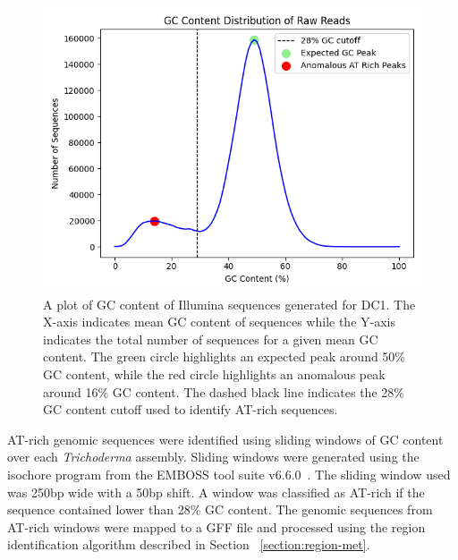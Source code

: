 \begin{figure}
  \centering
  \includegraphics[width=\textwidth]{figures/raw-dc1-gc-plot.png}
  \caption[GC content distribution for DC1]{A plot of GC content of Illumina sequences generated for
    DC1. The X-axis indicates mean GC content of sequences while the
    Y-axis indicates the total number of sequences for a given mean GC
    content. The green circle highlights an expected peak around 50\% GC content, while the red circle highlights an anomalous peak around 16\% GC content. The dashed black line indicates the 28\% GC content cutoff used to identify AT-rich sequences.}
  \label{fig:dc1-low-gc}
\end{figure}

AT-rich genomic sequences were identified using sliding windows of GC
content over each \textit{Trichoderma} assembly. Sliding windows were
generated using the isochore program from the EMBOSS tool suite
v6.6.0~\cite{rice2000a}. The sliding window used was 250bp wide with a
50bp shift. A window was classified as AT-rich if the sequence
contained lower than 28\% GC content. The genomic sequences from
AT-rich windows were mapped to a GFF file and processed using the
region identification algorithm described in Section
~\ref{section:region-met}.



